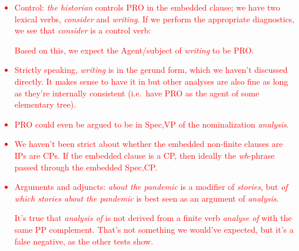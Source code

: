 \documentclass{article}
\begin{document}
\textcolor{red}{
    \begin{itemize}
        \item Control: \emph{the historian} controls PRO in the embedded clause; we have two lexical verbs, \emph{consider} and \emph{writing}. If we perform the appropriate diagnostics, we see that \emph{consider} is a control verb:
        \begin{exe}
        \end{exe}
        Based on this, we expect the Agent/subject of \emph{writing} to be PRO.
        \item Strictly speaking, \emph{writing} is in the gerund form, which we haven't discussed directly. It makes sense to have it in  but other analyses are also fine as long as they're internally consistent (i.e.~have PRO as the agent of some elementary tree).
        \item PRO could even be argued to be in Spec,VP of the nominalization \emph{analysis}.
        \item We haven't been strict about whether the embedded non-finite clauses are IPs are CPs. If the embedded clause is a CP, then ideally the \emph{wh}-phrase passed through the embedded Spec,CP.
        \item Arguments and adjuncts: \emph{about the pandemic} is a modifier of \emph{stories}, but \emph{of which stories about the pandemic} is best seen as an argument of \emph{analysis}.
        \begin{exe}
            \label{which_stories_step1}
        \end{exe}
        It's true that \emph{analysis of} is not derived from a finite verb \emph{analyse of} with the same PP complement. That's not something we would've expected, but it's a false negative, as the other tests show.
    \end{itemize}
}
\end{document}
